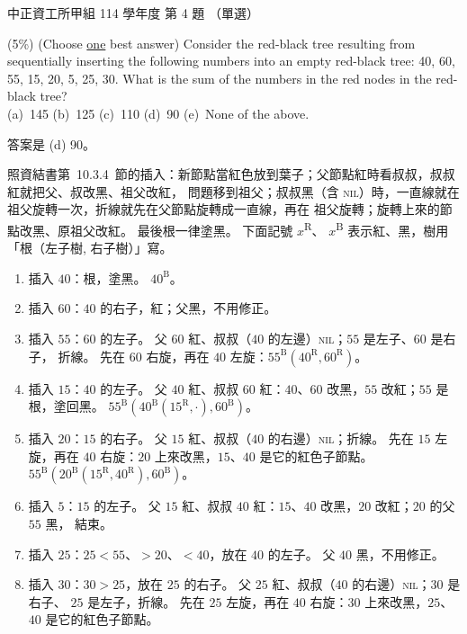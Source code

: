 \begin{pastexam}[label={px:ccu-114-swa-04}]{中正資工所甲組 114 學年度 第 4 題}
（單選）

(5\%) (Choose \underline{one} best answer) Consider the red-black tree resulting from sequentially
inserting the following numbers into an empty red-black tree: 40, 60, 55, 15, 20, 5, 25, 30. What is the
sum of the numbers in the red nodes in the red-black tree?\\
(a)~145 \qquad (b)~125 \qquad (c)~110 \qquad (d)~90 \qquad (e)~None of the above.
\end{pastexam}

\begin{pastsoln}
答案是 (d) 90。

照資結書第~10.3.4~節的插入：新節點當紅色放到葉子；父節點紅時看叔叔，叔叔紅就把父、叔改黑、祖父改紅，
問題移到祖父；叔叔黑（含 \textsc{nil}）時，一直線就在祖父旋轉一次，折線就先在父節點旋轉成一直線，再在
祖父旋轉；旋轉上來的節點改黑、原祖父改紅。 最後根一律塗黑。 下面記號 $x$\textsuperscript{R}、
$x$\textsuperscript{B} 表示紅、黑，樹用「根（左子樹, 右子樹）」寫。

\begin{enumerate}
\item 插入 $40$：根，塗黑。 $40^{\mathrm{B}}$。
\item 插入 $60$：$40$ 的右子，紅；父黑，不用修正。
\item 插入 $55$：$60$ 的左子。 父 $60$ 紅、叔叔（$40$ 的左邊）\textsc{nil}；$55$ 是左子、$60$ 是右子，
折線。 先在 $60$ 右旋，再在 $40$ 左旋：$55^{\mathrm{B}}(40^{\mathrm{R}}, 60^{\mathrm{R}})$。
\item 插入 $15$：$40$ 的左子。 父 $40$ 紅、叔叔 $60$ 紅：$40$、$60$ 改黑，$55$ 改紅；$55$ 是根，塗回黑。
$55^{\mathrm{B}}(40^{\mathrm{B}}(15^{\mathrm{R}}, \cdot), 60^{\mathrm{B}})$。
\item 插入 $20$：$15$ 的右子。 父 $15$ 紅、叔叔（$40$ 的右邊）\textsc{nil}；折線。 先在 $15$ 左旋，再在
$40$ 右旋：$20$ 上來改黑，$15$、$40$ 是它的紅色子節點。 $55^{\mathrm{B}}(20^{\mathrm{B}}(15^{\mathrm{R}},
40^{\mathrm{R}}), 60^{\mathrm{B}})$。
\item 插入 $5$：$15$ 的左子。 父 $15$ 紅、叔叔 $40$ 紅：$15$、$40$ 改黑，$20$ 改紅；$20$ 的父 $55$ 黑，
結束。
\item 插入 $25$：$25 < 55$、$> 20$、$< 40$，放在 $40$ 的左子。 父 $40$ 黑，不用修正。
\item 插入 $30$：$30 > 25$，放在 $25$ 的右子。 父 $25$ 紅、叔叔（$40$ 的右邊）\textsc{nil}；$30$ 是右子、
$25$ 是左子，折線。 先在 $25$ 左旋，再在 $40$ 右旋：$30$ 上來改黑，$25$、$40$ 是它的紅色子節點。
\end{enumerate}


\end{pastsoln}
